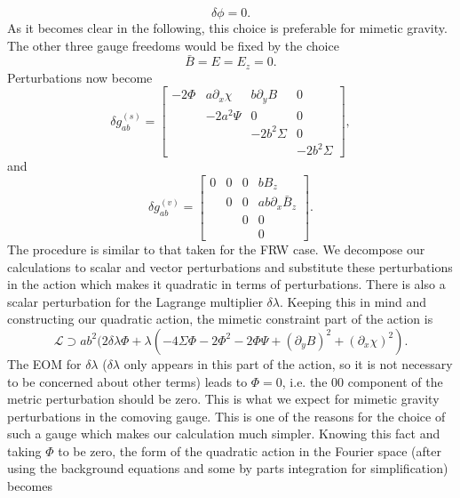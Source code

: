 \documentclass[%
 reprint,
 amsmath,amssymb,
 aps,
]{revtex4-1}
\begin{document}
\begin{equation}
\delta \phi=0.
\end{equation}
As it becomes clear in the following, this choice is preferable for mimetic gravity.
The other three gauge freedoms would be fixed by the choice
\begin{equation}
\bar{B}=E=E_z=0.
\end{equation}
Perturbations now become
\begin{equation}
\delta g_{ab}^{(s)}=
\begin{bmatrix}
-2\Phi       & a\partial_x\chi   &b\partial_yB           &0 \\
             & -2a^2\Psi         &0                      &0 \\
             &                   &-2 b^2\Sigma           &0 \\
             &                   &                       &-2b^2\Sigma
\end{bmatrix},
\end{equation}
and
\begin{equation}\label{metricvecper}
\delta g_{ab}^{(v)}=
\begin{bmatrix}
0      & 0    & 0    &bB_z \\
       & 0    & 0    &ab\partial_x\bar{B}_z \\
       &      & 0    &0\\
       &      &      &0
\end{bmatrix}.
\end{equation}
The procedure is similar to that taken for the FRW case. We decompose our calculations to scalar and vector perturbations and substitute these perturbations in the action which makes it quadratic in terms of perturbations.
There is also a scalar perturbation for the Lagrange multiplier $\delta \lambda$. Keeping this in mind and constructing our quadratic action, the mimetic constraint part of the action is
\begin{equation}
\mathcal{L}\supset ab^2(2\delta \lambda \Phi+\lambda(-4\Sigma\Phi-2\Phi^2-2\Phi\Psi+(\partial_y B)^2+(\partial_x \chi)^2).
\end{equation}
The EOM for $\delta \lambda$ ($\delta\lambda$ only appears in this part of the action, so it is not necessary to be concerned about other terms) leads to $\Phi=0$, i.e. the 00 component of the metric perturbation should be zero. This is what we expect for mimetic gravity perturbations in the comoving gauge. This is one of the reasons for the choice of such a gauge which makes our calculation  much simpler. Knowing this fact and taking $\Phi$ to be zero, the form of the quadratic action in the Fourier space (after using the background equations and some by parts integration for simplification) becomes
\end{document}
